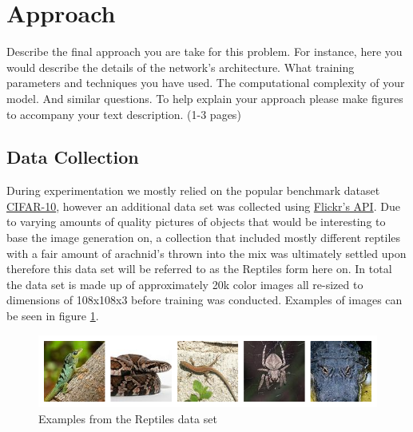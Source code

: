 
\section{Approach}

Describe the final approach you are take for this problem.
For instance, here you would describe the details of the network’s
architecture. What training parameters and techniques you have used.
The computational complexity of your model. And similar questions.
To help explain your approach please make figures to accompany your
text description. (1-3 pages)

\subsection{Data Collection}
During experimentation we mostly relied on the popular benchmark dataset \href{https://www.cs.toronto.edu/~kriz/cifar.html}{CIFAR-10}, however an additional data set was collected using \href{https://www.flickr.com/services/api/}{Flickr's API}. Due to varying amounts of quality pictures of objects that would be interesting to base the image generation on, a collection that included mostly different reptiles with a fair amount of arachnid's thrown into the mix was ultimately settled upon therefore this data set will be referred to as the Reptiles form here on. In total the data set is made up of approximately 20k color images all re-sized to dimensions of 108x108x3 before training was conducted. Examples of images can be seen in figure \ref{fig:reptiles}.

\begin{figure}[H]
\centering
\includegraphics[width=\textwidth]{figures/reptiles.png}
\caption{Examples from the Reptiles data set}
\label{fig:reptiles}
\end{figure}





